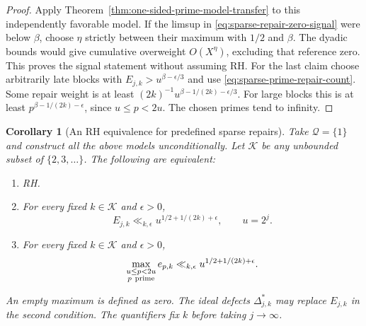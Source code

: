\documentclass[11pt]{article}
\newtheorem{corollary}[theorem]{Corollary}
\theoremstyle{definition}
\begin{document}
\begin{proof}
Apply Theorem~\ref{thm:one-sided-prime-model-transfer} to
this independently favorable model. If the limsup in
\eqref{eq:sparse-repair-zero-signal} were below $\beta$,
choose $\eta$ strictly between their maximum with $1/2$
and $\beta$. The dyadic bounds would give cumulative
overweight $O(X^\eta)$, excluding that reference zero.
This proves the signal statement without assuming RH.
For the last claim choose arbitrarily late blocks with
$E_{j,k}>u^{\beta-\epsilon/3}$ and use
\eqref{eq:sparse-prime-repair-count}. Some repair weight
is at least $(2k)^{-1}u^{\beta-1/(2k)-\epsilon/3}$.
For large blocks this is at least
$p^{\beta-1/(2k)-\epsilon}$, since $u\le p<2u$.
The chosen primes tend to infinity.
\end{proof}

\begin{corollary}[An RH equivalence for predefined sparse repairs]
\label{cor:predefined-sparse-repair-RH}
Take $\mathcal Q=\{1\}$ and construct all the above models
unconditionally. Let $\mathcal K$ be any unbounded subset
of $\{2,3,\ldots\}$. The following are equivalent:
\begin{enumerate}
\item RH.
\item For every fixed $k\in\mathcal K$ and $\epsilon>0$,
\begin{equation}
 E_{j,k}\ll_{k,\epsilon}
                u^{1/2+1/(2k)+\epsilon},\qquad u=2^j.
 \label{eq:sparse-repair-RH-total}
\end{equation}
\item For every fixed $k\in\mathcal K$ and $\epsilon>0$,
\begin{equation}
 \max_{\substack{u\le p<2u\\p\ {\rm prime}}}e_{p,k}
          \ll_{k,\epsilon}u^{1/2+1/(2k)+\epsilon}.
 \label{eq:sparse-repair-RH-individual}
\end{equation}
\end{enumerate}
An empty maximum is defined as zero. The ideal defects
$\Delta_{j,k}^*$ may replace $E_{j,k}$ in the second condition.
The quantifiers fix $k$ before taking $j\to\infty$.
\end{corollary}
\end{document}
